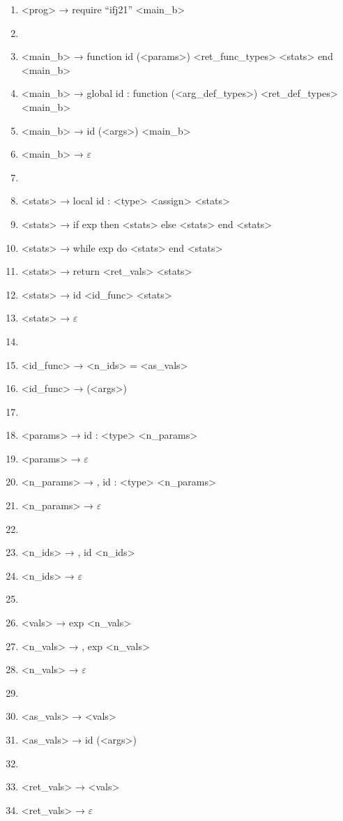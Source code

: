 \documentclass[a4paper, 12pt]{article}
\begin{document}
\begin{enumerate}
    \item <prog> → require “ifj21” <main\_b>
    \item[]
    \item <main\_b> → function id (<params>) <ret\_func\_types> <stats> end <main\_b>
    \item <main\_b> → global id : function (<arg\_def\_types>) <ret\_def\_types> <main\_b>
    \item <main\_b> → id (<args>) <main\_b>
    \item <main\_b> → $\varepsilon$
    \item[]
    \item <stats> → local id : <type> <assign> <stats>
    \item <stats> → if exp then <stats> else <stats> end <stats>
    \item <stats> → while exp do <stats> end <stats>
    \item <stats> → return <ret\_vals> <stats>
    \item <stats> → id <id\_func> <stats>
    \item <stats> → $\varepsilon$
    \item[]
    \item <id\_func> → <n\_ids> = <as\_vals>
    \item <id\_func> → (<args>)
    \item[]
    \item <params> → id : <type> <n\_params>
    \item <params> → $\varepsilon$
    \item <n\_params> → , id : <type> <n\_params>
    \item <n\_params> → $\varepsilon$
    \item[]
    \item <n\_ids> → , id <n\_ids>
    \item <n\_ids> → $\varepsilon$
    \item[]
    \item <vals> → exp <n\_vals>
    \item <n\_vals> → , exp <n\_vals>
    \item <n\_vals> → $\varepsilon$
    \item[]
    \item <as\_vals> → <vals>
    \item <as\_vals> → id (<args>)
    \item[]
    \item <ret\_vals> → <vals>
    \item <ret\_vals> → $\varepsilon$

\end{enumerate}
\end{document}
